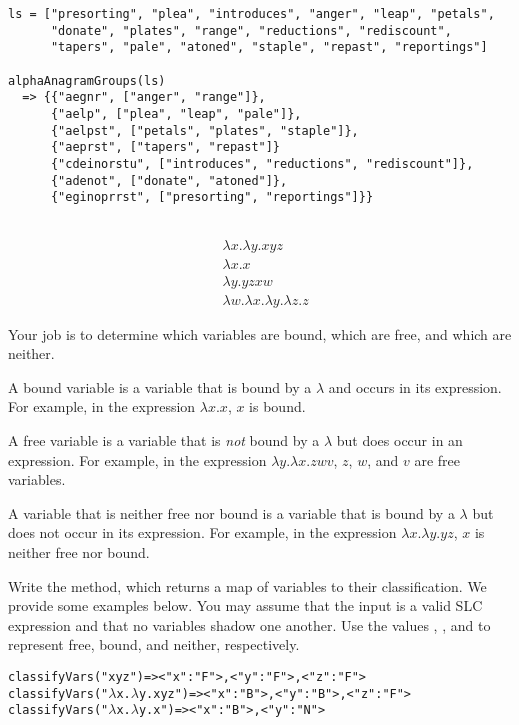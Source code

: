 \par{
\begin{verbatim}
ls = ["presorting", "plea", "introduces", "anger", "leap", "petals",
      "donate", "plates", "range", "reductions", "rediscount", 
      "tapers", "pale", "atoned", "staple", "repast", "reportings"]
      
alphaAnagramGroups(ls) 
  => {{"aegnr", ["anger", "range"]}, 
      {"aelp", ["plea", "leap", "pale"]}, 
      {"aelpst", ["petals", "plates", "staple"]}, 
      {"aeprst", ["tapers", "repast"]}
      {"cdeinorstu", ["introduces", "reductions", "rediscount"]}, 
      {"adenot", ["donate", "atoned"]}, 
      {"eginoprrst", ["presorting", "reportings"]}}
    
\end{verbatim}
}


\begin{align*}
  & \lambda{}x.\lambda{y}.xyz\\
  & \lambda{x}.x\\
  & \lambda{y}.yzxw\\
  & \lambda{w}.\lambda{x}.\lambda{y}.\lambda{z}.z
\end{align*}

Your job is to determine which variables are bound, which are free, and which are neither.

A bound variable is a variable that is bound by a $\lambda$ and occurs in its expression. For example, in the expression $\lambda{x}.x$, $x$ is bound.

A free variable is a variable that is \textit{not} bound by a $\lambda$ but does occur in an expression. For example, in the expression $\lambda{y}.\lambda{x}.zwv$, $z$, $w$, and $v$ are free variables.

A variable that is neither free nor bound is a variable that is bound by a $\lambda$ but does not occur in its expression. For example, in the expression $\lambda{}x.\lambda{}y.yz$, $x$ is neither free nor bound.

Write the  method, which returns a map of variables to their classification. We provide some examples below. You may assume that the input is a valid SLC expression and that no variables shadow one another. Use the values , , and  to represent free, bound, and neither, respectively.
\begin{alltt}
classifyVars("xyz")       => {<"x" : "F">, <"y" : "F">, <"z" : "F">}
classifyVars("\(\lambda\)x.\(\lambda\)y.xyz") => {<"x" : "B">, <"y" : "B">, <"z" : "F">}
classifyVars("\(\lambda\)x.\(\lambda\)y.x")   => {<"x" : "B">, <"y" : "N">}
\end{alltt}

